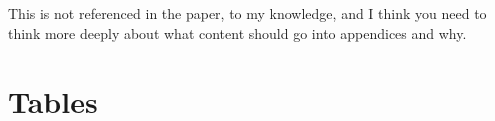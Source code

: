 \documentclass[11pt]{article}
\begin{document}
This is not referenced in the paper, to my knowledge, and I think you need to think more deeply about what content should go into appendices and why. 
%
%
%
%

\renewcommand{\theequation}{A\arabic{equation}}
\renewcommand{\thetable}{A\arabic{table}}
\setcounter{equation}{0}  %
\setcounter{figure}{0}
\setcounter{table}{0}

%
%




\newpage{}

\section*{Tables}
\renewcommand{\thetable}{\arabic{table}}
\setcounter{table}{0}

\renewcommand{\thetable}{\arabic{table}}
\setcounter{table}{0}
\end{document}
